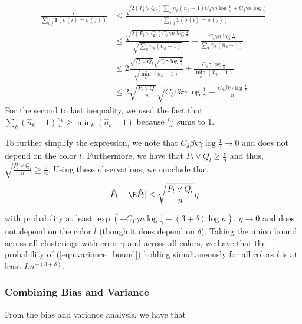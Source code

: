 \documentclass{article}
\begin{document}
\begin{align*}
 \frac{t}{\sum_{i,j} \mathbf{1}(\sigma(i) = \sigma(j)) } &\leq
   \frac{  \sqrt{  2 (P_l \vee Q_l) \sum_k \hat{n}_k (\hat{n}_k - 1) C_\delta \gamma n \log \frac{1}{\gamma} } + C_\delta \gamma n \log \frac{1}{\gamma} }
        { \sum_{i,j} \mathbf{1}(\sigma(i) = \sigma(j) ) }  \\
  &\leq \frac{\sqrt{2 (P_l \vee Q_l) C_\delta \gamma n \log \frac{1}{\gamma}}}
             {\sqrt{ \sum_k \hat{n}_k (\hat{n}_k - 1)}} + 
          \frac{C_\delta \gamma n \log \frac{1}{\gamma}}
             {\sum_k \hat{n}_k (\hat{n}_k - 1)} \\
 &\leq 2 \frac{ \sqrt{P_l\vee Q_l} \sqrt{ C_\delta \gamma \log \frac{1}{\gamma}} }
           {\sqrt{ \min_k (\hat{n}_k - 1)}} + 
       \frac{C_\delta \gamma \log \frac{1}{\delta}}{\min_k (\hat{n}_k - 1)} \\
 &\leq 2 \sqrt{ \frac{P_l \vee Q_l}{n} } \sqrt{C_\delta \beta k \gamma \log \frac{1}{\gamma}} + 
       \frac{C_\delta \beta k \gamma \log \frac{1}{\gamma}}{n} 
\end{align*}
For the second to last inequality, we used the fact that $\sum_k (\hat{n}_k - 1) \frac{\hat{n}_k}{n} \geq \min_k (\hat{n}_k - 1)$ because $\frac{\hat{n}_k}{n}$ sums to 1. 

To further simplify the expression, we note that $C_\delta \beta k \gamma \log \frac{1}{\gamma} \rightarrow 0$ and does not depend on the color $l$. Furthermore, we have that $P_l \vee Q_l \geq \frac{c}{n}$ and thus, $\sqrt{ \frac{P_l \vee Q_l}{n} } \geq \frac{c}{n}$. Using these observations, we conclude that
\begin{align}
| \hat{P}_l - \E \hat{P}_l | \leq \sqrt{ \frac{P_l \vee Q_l}{n} } \eta \label{eqn:variance_bound}
\end{align}

with probability at least $\exp( -C_1 \gamma n \log \frac{1}{\gamma} - (3 + \delta) \log n)$. $\eta \rightarrow 0$ and does not depend on the color $l$ (though it does depend on $\delta$). Taking the union bound across all clusterings with error $\gamma$ and across all colors, we have that the probability of (\ref{eqn:variance_bound}) holding simultaneously for all colors $l$ is at least $L n^{-(3+\delta)}$. 

\subsubsection{Combining Bias and Variance}

From the bias and variance analysis, we have that 
\end{document}
